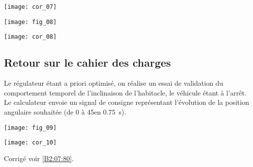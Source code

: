 \ifprof
\begin{corrige}
\begin{center}
\texttt{[image: cor\_07]}
\end{center}
\end{corrige}
\else
\fi
\begin{center}
\texttt{[image: fig\_08]}
\end{center}


\ifprof
\begin{corrige}
\begin{center}
\texttt{[image: cor\_08]}
\end{center}
\end{corrige}
\else
\fi

\ifprof
\else
\subsection*{Retour sur le cahier des charges}
Le régulateur étant a priori optimisé, on réalise un essai de validation du comportement temporel de l'inclinaison de l'habitacle, le véhicule étant à l'arrêt. Le calculateur envoie un signal de consigne représentant l'évolution de la position angulaire souhaitée (de 0 à 45\degres en \SI{0,75}{s}). 

\begin{center}
\texttt{[image: fig\_09]}
\end{center}
\fi

\ifprof
\begin{corrige}
\begin{center}
\texttt{[image: cor\_10]}
\end{center}

\end{corrige}
\else
\fi



\ifprof
\else
\begin{flushright}
\footnotesize{Corrigé  voir \ref{B2:07:80}.}
\end{flushright}%
\fi